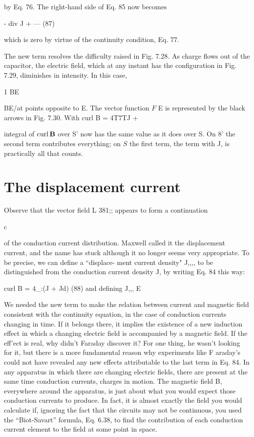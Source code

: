 by Eq. 76. The right-hand side of Eq. 85 now becomes

\begin{equation}
\end{equation}
- div J + --- (87)

which is zero by virtue of the continuity condition, Eq. 77.

The new term resolves the difficulty raised in Fig. 7.28. As charge
flows out of the capacitor, the electric field, which at any instant has
the configuration in Fig. 7.29, diminishes in intensity. In this case,

\begin{equation}
\end{equation}
1 BE

BE/at points opposite to E. The vector function $F$ E is represented
by the black arrows in Fig. 7.30. With curl B = 4T7TJ + %

integral of $\operatorname{curl}\mathbf{B}$ over S' now has the same value as it does over S.
On 8' the second term contributes everything; on $S$ the first term, the
term with J, is practically all that counts.

\section{The displacement current}

Observe that the vector field L 381;; appears to form a continuation

c

of the conduction current distribution. Maxwell called it the displacement
current, and the name has stuck although it no longer
seems very appropriate. To be precise, we can define a ``displace-
ment current density" J,,,, to be distinguished from the conduction
current density J, by writing Eq. 84 this way:

\begin{equation}
\end{equation}
curl B = 4_:(J + Jd) (88)
and defining J,,, E 

We needed the new term to make the relation between current and
magnetic field consistent with the continuity equation, in the case
of conduction currents changing in time. If it belongs there, it
implies the existence of a new induction effect in which a changing
electric field is accompanied by a magnetic field. If the eff'ect is real,
why didn't Faraday discover it? For one thing, he wasn't looking
for it, but there is a more fundamental reason why experiments like
F araday's could not have revealed any new effects attributable to the
last term in Eq. 84. In any apparatus in which there are changing
electric fields, there are present at the same time conduction currents,
charges in motion. The magnetic field B, everywhere around the
apparatus, is just about what you would expect those conduction
currents to produce. In fact, it is almost exactly the field you would
calculate if, ignoring the fact that the circuits may not be continuous,
you used the ``Biot-Savart'' formula, Eq. 6.38, to find the contribution
of each conduction current element to the field at some point in space.

